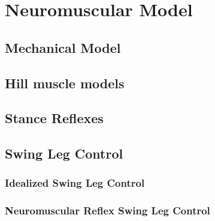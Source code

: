 \chapter{Neuromuscular Model}\label{sec:neuro_model}

\section{Mechanical Model}
\section{Hill muscle models}
\section{Stance Reflexes}
\section{Swing Leg Control}
\subsection{Idealized Swing Leg Control}
\subsection{Neuromuscular Reflex Swing Leg Control}
